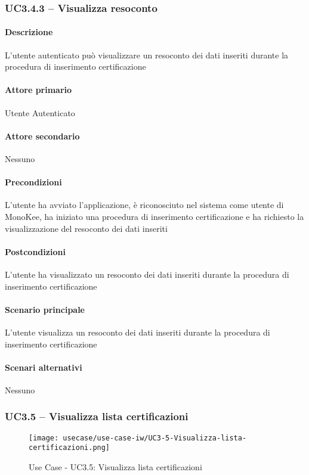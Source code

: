 \subsubsection{UC3.4.3 – Visualizza resoconto}
\paragraph{Descrizione}  L’utente autenticato può visualizzare un resoconto dei dati inseriti durante la procedura di inserimento certificazione
\paragraph{Attore primario}  Utente Autenticato
\paragraph{Attore secondario}  Nessuno
\paragraph{Precondizioni} L’utente ha avviato l’applicazione, è riconosciuto nel sistema come utente di MonoKee, ha iniziato una procedura di inserimento certificazione e ha richiesto la visualizzazione del resoconto dei dati inseriti
\paragraph{Postcondizioni}  L’utente ha visualizzato un resoconto dei dati inseriti durante la procedura di inserimento certificazione
\paragraph{Scenario principale}  
L’utente visualizza un resoconto dei dati inseriti durante la procedura di inserimento certificazione
\paragraph{Scenari alternativi}  Nessuno






\subsubsection{UC3.5 – Visualizza lista certificazioni}
\begin{figure}[!htbp] 
    \centering 
    \texttt{[image: usecase/use-case-iw/UC3-5-Visualizza-lista-certificazioni.png]} 
    \caption{Use Case - UC3.5: Visualizza lista certificazioni}
\end{figure}

